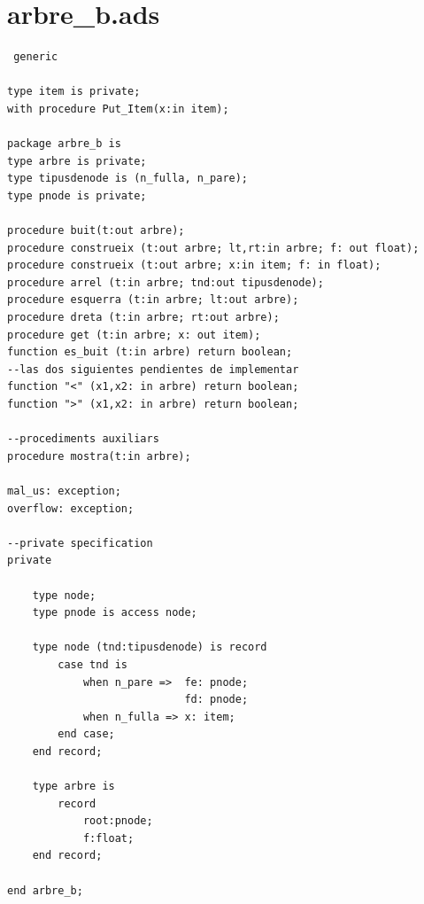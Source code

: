 \documentclass[a4paper,12pt]{article}
\begin{document}
\section{arbre\_b.ads}
\begin{lstlisting}
 generic 

type item is private;
with procedure Put_Item(x:in item);

package arbre_b is
type arbre is private;
type tipusdenode is (n_fulla, n_pare);
type pnode is private;

procedure buit(t:out arbre);
procedure construeix (t:out arbre; lt,rt:in arbre; f: out float);
procedure construeix (t:out arbre; x:in item; f: in float);
procedure arrel (t:in arbre; tnd:out tipusdenode);
procedure esquerra (t:in arbre; lt:out arbre);
procedure dreta (t:in arbre; rt:out arbre);
procedure get (t:in arbre; x: out item);
function es_buit (t:in arbre) return boolean;
--las dos siguientes pendientes de implementar
function "<" (x1,x2: in arbre) return boolean;
function ">" (x1,x2: in arbre) return boolean;

--procediments auxiliars
procedure mostra(t:in arbre);

mal_us: exception;
overflow: exception;

--private specification
private

	type node;
	type pnode is access node;
	
	type node (tnd:tipusdenode) is record
		case tnd is
			when n_pare =>  fe: pnode;
							fd: pnode;
			when n_fulla => x: item;
		end case;
	end record;
	
	type arbre is 
		record
			root:pnode;
			f:float;
	end record;
	
end arbre_b;
	

\end{lstlisting}
\end{document}

